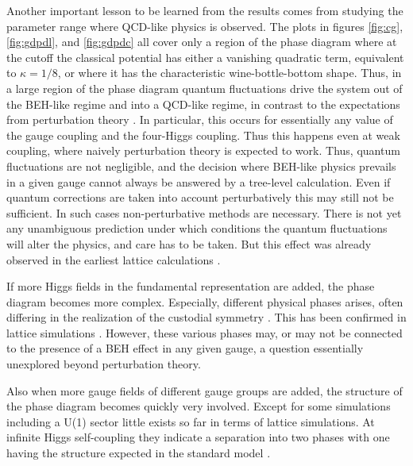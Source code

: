 \documentclass[final,twoside,12pt]{article}
\newcommand*{\1}{1\!\!\!\bot}
\begin{document}
Another important lesson to be learned from the results comes from studying the parameter range where QCD-like physics is observed. The plots in figures \ref{fig:cg}, \ref{fig:gdpdl}, and \ref{fig:gdpdc} all cover only a region of the phase diagram where at the cutoff the classical potential has either a vanishing quadratic term, equivalent to $\kappa=1/8$, or where it has the characteristic wine-bottle-bottom shape. Thus, in a large region of the phase diagram quantum fluctuations drive the system out of the BEH-like regime and into a QCD-like regime, in contrast to the expectations from perturbation theory \cite{Bohm:2001yx,Kapusta:2006pm}. In particular, this occurs for essentially any value of the gauge coupling and the four-Higgs coupling. Thus this happens even at weak coupling, where naively perturbation theory is expected to work. Thus, quantum fluctuations are not negligible, and the decision where BEH-like physics prevails in a given gauge cannot always be answered by a tree-level calculation. Even if quantum corrections are taken into account perturbatively \cite{Coleman:1973jx,Kapusta:2006pm} this may still not be sufficient. In such cases non-perturbative methods are necessary. There is not yet any unambiguous prediction under which conditions the quantum fluctuations will alter the physics, and care has to be taken. But this effect was already observed in the earliest lattice calculations \cite{Evertz:1985fc,Langguth:1985eu,Langguth:1985dr}.

If more Higgs fields in the fundamental representation are added, the phase diagram becomes more complex. Especially, different physical phases arises, often differing in the realization of the custodial symmetry \cite{Branco:2011iw,Ivanov:2017dad}. This has been confirmed in lattice simulations \cite{Lewis:2010ps,Wurtz:2009gf}. However, these various phases may, or may not be connected to the presence of a BEH effect in any given gauge, a question essentially unexplored beyond perturbation theory.

Also when more gauge fields of different gauge groups are added, the structure of the phase diagram becomes quickly very involved. Except for some simulations including a U(1) sector \cite{Shrock:1985un,Zubkov:2010np,Zubkov:2011sk,Zubkov:2011ia} little exists so far in terms of lattice simulations. At infinite Higgs self-coupling they indicate a separation into two phases with one having the structure expected in the standard model \cite{Shrock:1985ur}.
\end{document}
